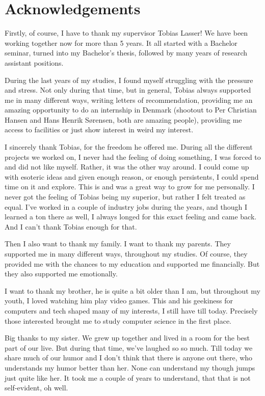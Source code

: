 \thispagestyle{empty}
\chapter*{Acknowledgements}
\noindent%

Firstly, of course, I have to thank my supervisor Tobias Lasser! We have been working together now
for more than 5 years. It all started with a Bachelor seminar, turned into my Bachelor's thesis,
followed by many years of research assistant positions.

During the last years of my studies, I found myself struggling with the pressure and stress. Not
only during that time, but in general, Tobias always supported me in many different ways, writing
letters of recommendation, providing me an amazing opportunity to do an internship in Denmark
(shootout to Per Christian Hansen and Hans Henrik Sørensen, both are amazing people), providing me
access to facilities or just show interest in weird my interest.

I sincerely thank Tobias, for the freedom he offered me. During all the different projects we worked
on, I never had the feeling of doing something, I was forced to and did not like myself. Rather, it
was the other way around. I could come up with esoteric ideas and given enough reason, or enough
persistents, I could spend time on it and explore. This is and was a great way to grow for me
personally. I never got the feeling of Tobias being my superior, but rather I felt treated as equal.
I've worked in a couple of industry jobs during the years, and though I learned a ton there as well,
I always longed for this exact feeling and came back. And I can't thank Tobias enough for that.

Then I also want to thank my family. I want to thank my parents. They supported me in many different
ways, throughout my studies. Of course, they provided me with the chances to my education and
supported me financially. But they also supported me emotionally.

I want to thank my brother, he is quite a bit older than I am, but throughout my youth, I loved
watching him play video games. This and his geekiness for computers and tech shaped many of my
interests, I still have till today. Precisely those interested brought me to study computer science
in the first place.

Big thanks to my sister. We grew up together and lived in a room for the best part of our live. But
during that time, we've laughed so so much. Till today we share much of our humor and I don't think
that there is anyone out there, who understands my humor better than her. None can understand my
though jumps just quite like her. It took me a couple of years to understand, that that is not
self-evident, oh well.

